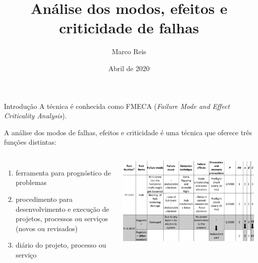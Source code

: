 \documentclass[aspectratio=169]{beamer}
\title              {Análise dos modos, efeitos e criticidade de falhas}
\author             {Marco Reis}
\institute          {Laboratório de Robótica e Sistemas Autônomos, Senai Cimatec}
\date               {Abril de 2020}
\begin{document}
\begin{frame}[t,plain]
    \titlepage
\end{frame}
\begin{frame}[t]{Introdução} 
A técnica é conhecida como FMECA (\textit{Failure Mode and Effect Criticality Analysis}).

A análise dos modos de falhas, efeitos e criticidade é uma técnica que oferece três funções distintas:
\newline
    \begin{columns}[c]
            \begin{enumerate}
                \item ferramenta para prognóstico de problemas
                \item procedimento para desenvolvimento e execução de projetos, processos ou serviços (novos ou revisados)
                \item diário do projeto, processo ou serviço
            \end{enumerate}
            \includegraphics[width=.9\textwidth]{fmeca}
    \end{columns}
\end{frame}
\end{document}
